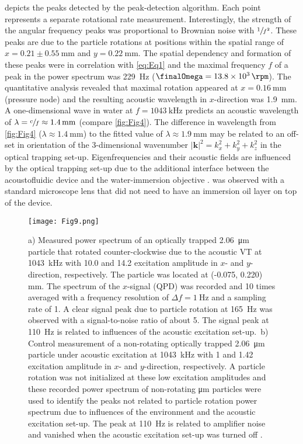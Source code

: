  depicts the peaks detected by the peak-detection algorithm. 
Each point represents a separate rotational rate measurement. Interestingly, the 
strength of the angular frequency peaks was proportional to Brownian noise with 
$\sfrac{1}{f^2}$. These peaks are due to the particle rotations at positions 
within the spatial range of $x=0.21\pm\SI{0.55}{\mm}$ and $y=\SI{0.22}{\mm}$.  
The spatial dependency and formation of these peaks were in correlation with 
\cref{eq:Eq1} and the maximal frequency $f$ of a peak in the power spectrum was 
\SI{229}{\hertz} ($ \finalOmega = \SI{13.8e3}{\rpm} $). The quantitative 
analysis revealed that maximal rotation appeared at $x=\SI{0.16}{\mm}$ (pressure 
node) and the resulting acoustic wavelength in $x$-direction was \SI{1.9}{\mm}.  
A one-dimensional wave in water at $f=\SI{1043}{\kilo\hertz}$ predicts an 
acoustic wavelength of $\lambda = \sfrac{c}{f} \approx \SI{1.4}{\mm}$ (compare 
\cref{fig:Fig4}). The difference in wavelength from \cref{fig:Fig4} ($\lambda 
\approx \SI{1.4}{\mm} $) to the fitted value of $\lambda \approx \SI{1.9}{\mm} $ 
may be related to an off-set in orientation of the 3-dimensional wavenumber 
$|\bm{k}|^{2} = k^{2}_{x} + k^{2}_{y} + k^{2}_{z}$ in the optical trapping 
set-up. Eigenfrequencies and their acoustic fields are influenced by the 
optical trapping set-up due to the additional interface between the 
acoustofluidic device and the water-immersion objective \cite{Lamprecht2016}.  
 was observed with a standard microscope lens that did not need 
to have an immersion oil layer on top of the device.

\begin{figure}
    \centering
    \texttt{[image: Fig9.png]}
    \caption{a) Measured power spectrum of an optically trapped 
    \SI{2.06}{\micro\meter} particle that rotated counter-clockwise due to the 
    acoustic VT at \SI{1043}{\kilo\hertz} with \SI{10.0}{\Vrms} and 
    \SI{14.2}{\Vrms} excitation amplitude in $x$- and $y$-direction, 
    respectively. The particle was located at (-0.075, 0.220) \si{\mm}. The 
    spectrum of the $x$-signal (QPD) was recorded and 10 times averaged with a 
    frequency resolution of $\Delta f=\SI{1}{\hertz}$ and a sampling rate of 
    \SI{1}{\MS}. A clear signal peak due to particle rotation at 
  \SI{165}{\hertz} was observed with a signal-to-noise ratio of about 5. The 
signal peak at \SI{110}{\hertz} is related to influences of the acoustic 
excitation set-up.\ b) Control measurement of a non-rotating optically trapped 
\SI{2.06}{\micro\meter} particle under acoustic excitation at 
\SI{1043}{\kilo\hertz} with \SI{1}{\Vrms} and \SI{1.42}{\Vrms} excitation 
amplitude in $x$- and $y$-direction, respectively. A particle rotation was not 
initialized at these low excitation amplitudes and these recorded power spectrum 
of non-rotating \si{\micro\meter} particles were used to identify the peaks not 
related to particle rotation power spectrum due to influences of the environment 
and the acoustic excitation set-up. The peak at \SI{110}{\hertz} is related to 
amplifier noise and vanished when the acoustic excitation set-up was turned off 
\cite{Lamprecht2016}.\label{fig:Fig8}}
\end{figure}

